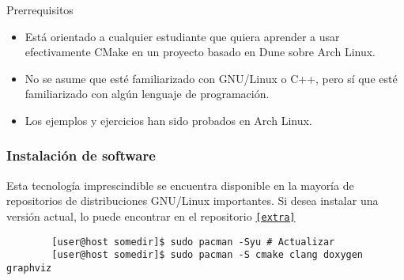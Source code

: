 \begin{frame}[fragile]
	\begin{block}{Prerrequisitos}
		\begin{itemize}
			\item

			Está orientado a cualquier estudiante que quiera aprender
			a usar efectivamente CMake en un proyecto basado en Dune
			sobre Arch Linux.
			
			\item

			No se asume que esté familiarizado con GNU/Linux o C++,
			pero sí que esté familiarizado con algún lenguaje de
			programación.
			
			\item

			Los ejemplos y ejercicios han sido probados en Arch
			Linux.
		\end{itemize}
	\end{block}
\end{frame}

\begin{frame}[fragile]
	\frametitle{Instalación de software}
	Esta tecnología imprescindible se encuentra disponible en la
	mayoría de repositorios de distribuciones GNU/Linux importantes.
	Si desea instalar una versión actual, lo puede encontrar en el
	repositorio \href{https://archlinux.org/packages/extra/x86_64/cmake}{\lstinline{[extra]}}

	\begin{verbatim}
		[user@host somedir]$ sudo pacman -Syu # Actualizar
		[user@host somedir]$ sudo pacman -S cmake clang doxygen graphviz
	\end{verbatim}
\end{frame}


